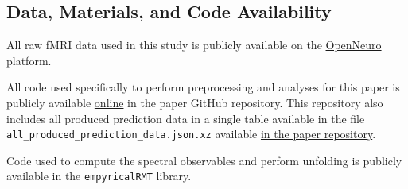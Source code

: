 \documentclass[12pt]{spieman}  %
\newcommand{\code}[1]{\small\texttt{#1}\normalsize}
\begin{document}
\begin{spacing}{2}
\section*{Data, Materials, and Code Availability}
\label{sec:data-and-code}

All raw fMRI data used in this study is publicly available on the
\href{https://openneuro.org/}{OpenNeuro}
platform\cite{poldrackOpenfMRIOpenSharing2017,
markiewiczOpenNeuroResourceSharing2021}.

All code used specifically to perform preprocessing and analyses for this paper
is publicly available \href{https://github.com/DM-Berger/random-matrix-fmri/}{online} in
the paper GitHub repository\cite{dm-bergerDMBergerRandommatrixfmriPaper2022}.
This repository also includes all produced prediction data in a single table
available in the file \code{all\_produced\_prediction\_data.json.xz} available
\href{https://github.com/DM-Berger/random-matrix-fmri/blob/master/all\_produced\_prediction\_data.json.xz}{in
the paper repository}.

Code used to compute the spectral observables and
perform unfolding is publicly available in the
\href{https://github.com/stfxecutables/empyricalRMT}\code{empyricalRMT}
library\cite{dm-bergerStfxecutablesEmpyricalRMTV12022}.







\end{spacing}
\end{document}
